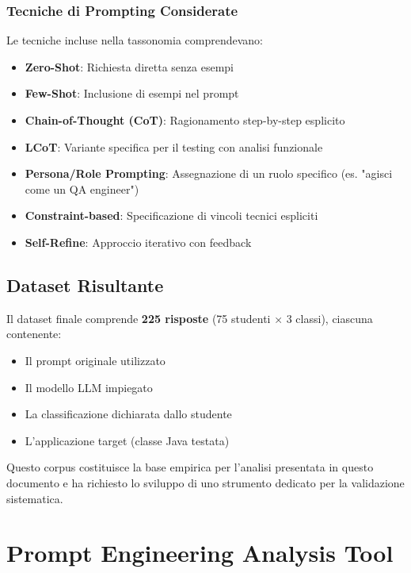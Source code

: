 \documentclass[a4paper,12pt]{article}
\begin{document}
\subsubsection{Tecniche di Prompting Considerate}
Le tecniche incluse nella tassonomia comprendevano:
\begin{itemize}
    \item \textbf{Zero-Shot}: Richiesta diretta senza esempi
    \item \textbf{Few-Shot}: Inclusione di esempi nel prompt
    \item \textbf{Chain-of-Thought (CoT)}: Ragionamento step-by-step esplicito
    \item \textbf{LCoT}: Variante specifica per il testing con analisi funzionale
    \item \textbf{Persona/Role Prompting}: Assegnazione di un ruolo specifico (es. "agisci come un QA engineer")
    \item \textbf{Constraint-based}: Specificazione di vincoli tecnici espliciti
    \item \textbf{Self-Refine}: Approccio iterativo con feedback
\end{itemize}

\subsection{Dataset Risultante}
Il dataset finale comprende \textbf{225 risposte} (75 studenti × 3 classi), ciascuna contenente:
\begin{itemize}
    \item Il prompt originale utilizzato
    \item Il modello LLM impiegato
    \item La classificazione dichiarata dallo studente
    \item L'applicazione target (classe Java testata)
\end{itemize}

Questo corpus costituisce la base empirica per l'analisi presentata in questo documento e ha richiesto lo sviluppo di uno strumento dedicato per la validazione sistematica.

\section{Prompt Engineering Analysis Tool}
\end{document}
